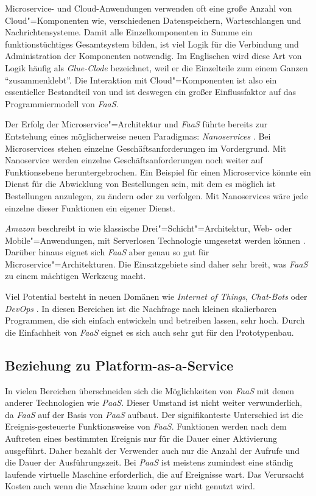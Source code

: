 Microservice- und Cloud-Anwendungen verwenden oft eine große Anzahl von Cloud"=Komponenten wie, verschiedenen Datenspeichern, Warteschlangen und Nachrichtensysteme. Damit alle Einzelkomponenten in Summe ein funktionstüchtiges Gesamtsystem bilden, ist viel Logik für die Verbindung und Administration der Komponenten notwendig. Im Englischen wird diese Art von Logik häufig als \textit{Glue-Clode} bezeichnet, weil er die Einzelteile zum einem Ganzen "`zusammenklebt"'. Die Interaktion mit Cloud"=Komponenten ist also ein essentieller Bestandteil von und ist deswegen ein großer Einflussfaktor auf das Programmiermodell von \textit{FaaS}.

Der Erfolg der Microservice"=Architektur und \textit{FaaS} führte bereits zur Entstehung eines möglicherweise neuen Paradigmas: \textit{Nanoservices} \cite{infoqFaaS}. Bei Microservices stehen einzelne Geschäftsanforderungen im Vordergrund. Mit Nanoservice werden einzelne Geschäftsanforderungen noch weiter auf Funktionsebene heruntergebrochen. Ein Beispiel für einen Microservice könnte ein Dienst für die Abwicklung von Bestellungen sein, mit dem es möglich ist Bestellungen anzulegen, zu ändern oder zu verfolgen. Mit Nanoservices wäre jede einzelne dieser Funktionen ein eigener Dienst.

\textit{Amazon} beschreibt in \cite{AwsMultiTier} wie klassische Drei"=Schicht"=Architektur, \zB Web- oder Mobile"=Anwendungen, mit Serverlosen Technologie umgesetzt werden können . Darüber hinaus eignet sich \textit{FaaS} aber genau so gut für Microservice"=Architekturen. Die Einsatzgebiete sind daher sehr breit, was \textit{FaaS} zu einem mächtigen Werkzeug macht.

Viel Potential besteht in neuen Domänen wie \textit{Internet of Things}, \textit{Chat-Bots} oder \textit{DevOps} \cite{NewStackAzurePreview}. In diesen Bereichen ist die Nachfrage nach kleinen skalierbaren Programmen, die sich einfach entwickeln und betreiben lassen, sehr hoch. Durch die Einfachheit von \textit{FaaS} eignet es sich auch sehr gut für den Prototypenbau.

\subsection{Beziehung zu Platform-as-a-Service}

In vielen Bereichen überschneiden sich die Möglichkeiten von \textit{FaaS} mit denen anderer Technologien wie \zB \textit{PaaS}. Dieser Umstand ist nicht weiter verwunderlich, da \textit{FaaS} auf der Basis von \textit{PaaS} aufbaut. Der signifikanteste Unterschied ist die Ereignis-gesteuerte Funktionsweise von \textit{FaaS}. Funktionen werden nach dem Auftreten eines bestimmten Ereignis nur für die Dauer einer Aktivierung ausgeführt. Daher bezahlt der Verwender auch nur die Anzahl der Aufrufe und die Dauer der Ausführungszeit. Bei \textit{PaaS} ist meistens zumindest eine ständig laufende virtuelle Maschine erforderlich, die auf Ereignisse wart. Das Verursacht Kosten auch wenn die Maschine kaum oder gar nicht genutzt wird.

